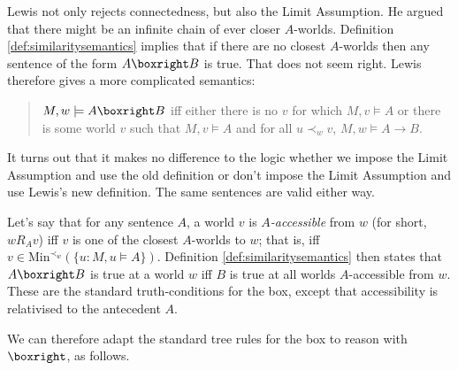 Lewis not only rejects connectedness, but also the Limit Assumption. He argued
that there might be an infinite chain of ever closer $A$-worlds. Definition
\ref{def:similaritysemantics} implies that if there are no closest $A$-worlds
then any sentence of the form $A \boxright B$ is true. That does not seem right.
Lewis therefore gives a more complicated semantics:

\begin{quote}
  $M,w \models A \boxright B$ iff either there is no $v$ for
  which $M,v\models A$ or there is some world $v$ such that
  $M,v\models A$ and for all $u \prec_w v$, $M,w \models A \to B$.
\end{quote}
%
It turns out that it makes no difference to the logic whether we impose the
Limit Assumption and use the old definition or don't impose the Limit Assumption
and use Lewis's new definition. The same sentences are valid either
way. %


\iffalse

Let's say that for any sentence $A$, a world $v$ is \emph{$A$-accessible} from
$w$ (for short, $wR_Av$) iff $v$ is one of the closest $A$-worlds to $w$; that
is, iff $v \in \mathrm{Min}^{\prec_w}(\{u: M,u \models A\})$. Definition
\ref{def:similaritysemantics} then states that $A \boxright B$ is true at a
world $w$ iff $B$ is true at all worlds $A$-accessible from $w$. These are the
standard truth-conditions for the box, except that accessibility is relativised
to the antecedent $A$.

We can therefore adapt the standard tree rules for the box to reason with
$\boxright$, as follows.

\bigskip
\begin{center}
\begin{minipage}{0.4\textwidth} \centering
{}
\end{minipage}
\begin{minipage}{0.4\textwidth}\centering
{}
\end{minipage}
\end{center}
\bigskip

